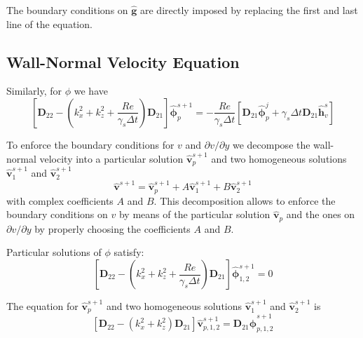 \documentclass[titlepage,12pt,letter]{article}
\newcommand{\bracket}[1]{\left[ #1 \right]}
\newcommand{\re}{Re}
\numberwithin{equation}{section}
\begin{document}
The boundary conditions on $\hat{\bm{g}}$ are directly imposed by replacing the first and last line of the equation.

\subsection{Wall-Normal Velocity Equation}
Similarly, for $\phi$ we have
\begin{equation}
	\bracket{\bm{D}_{22}-\left(k_x^{2}+k_z^{2}+\frac{\re}{\gamma_{s} \Delta t}\right) \bm{D}_{21}} \hat{\bm{\phi}}_p^{s+1}=-\frac{\re}{\gamma_{s} \Delta t} \bracket{ \bm{D}_{21} \hat{\bm{\phi}}_p^{j}+\gamma_{s} \Delta t \bm{D}_{21} \hat{\bm{h}}_{v}^{s} } \label{eq:phip}
\end{equation}

To enforce the boundary conditions for $v$ and $\partial v / \partial y$ we decompose the wall-normal velocity into a particular solution $\hat{\bm{v}}_{p}^{s+1}$ and two homogeneous solutions $\hat{\bm{v}}_{1}^{s+1}$ and $\hat{\bm{v}}_{2}^{s+1}$
\begin{equation*}
\hat{\bm{v}}^{s+1}=\hat{\bm{v}}_{p}^{s+1}+A \hat{\bm{v}}_{1}^{s+1}+B \hat{\bm{v}}_{2}^{s+1}
\end{equation*}
with complex coefficients $A$ and $B$. This decomposition allows to enforce the boundary conditions on $v$ by means of the particular solution $\hat{\bm{v}}_{p}$ and the ones on $\partial v / \partial y$ by properly choosing the coefficients $A$ and $B$. 

Particular solutions of $\phi$ satisfy:
\begin{equation}
	\bracket{\bm{D}_{22}-\left(k_x^{2}+k_z^{2}+\frac{\re}{\gamma_{s} \Delta t}\right) \bm{D}_{21}} \hat{\bm{\phi}}_{1,2}^{s+1}=0 \label{eq:phi1}
\end{equation}


The equation for  $\hat{\bm{v}}_{p}^{s+1}$ and two homogeneous solutions $\hat{\bm{v}}_{1}^{s+1}$ and $\hat{\bm{v}}_{2}^{s+1}$ is
\begin{equation}
		\bracket{\bm{D}_{22}-\left(k_x^{2}+k_z^{2}\right) \bm{D}_{21}} \hat{\bm{v}}_{p,1,2}^{s+1}=\bm{D}_{21} \hat{\bm{\phi}}_{p,1,2}^{s+1} \label{eq:v}
\end{equation}
\end{document}
